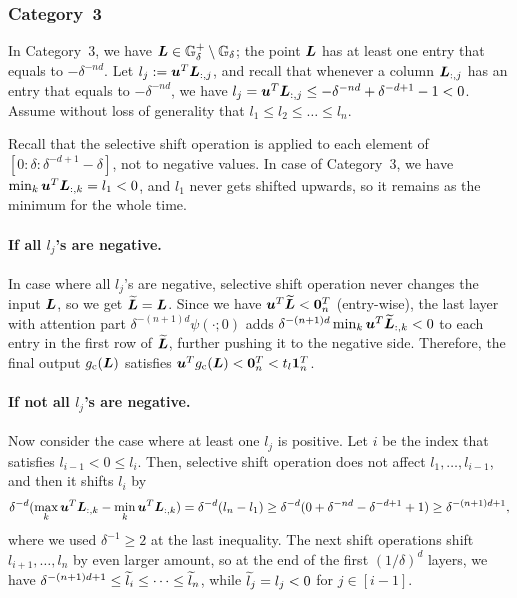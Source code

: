 \subsubsection{Category~3}
In Category~3, we have ${\bm{L}} \in {\mathbb{G}}^+_{\delta} \setminus {\mathbb{G}}_{\delta}$; the point ${\bm{L}}$ has at least one entry that equals to $-\delta^{-nd}$.
Let $l_j := {\bm{u}}^T {\bm{L}}_{:,j}$, and recall that whenever a column ${\bm{L}}_{:,j}$ has an entry that equals to $-\delta^{-nd}$, we have $l_j = {\bm{u}}^T {\bm{L}}_{:,j} \leq -\delta^{-nd} + \delta^{-d+1} - 1 < 0$.
Assume without loss of generality that $l_1 \leq l_2 \leq \dots \leq l_n$.

Recall that the selective shift operation is applied to each element of $[0:\delta:\delta^{-d+1}-\delta]$, not to negative values.
In case of Category~3, we have $\min_k {\bm{u}}^T {\bm{L}}_{:,k} = l_1 < 0$, and $l_1$ never gets shifted upwards, so it remains as the minimum for the whole time.

\paragraph{If all $l_j$'s are negative.}
In case where all $l_j$'s are negative, selective shift operation never changes the input ${\bm{L}}$, so we get $\widetilde{{\bm{L}}} = {\bm{L}}$. Since we have ${\bm{u}}^T \widetilde{{\bm{L}}} < {\bm{0}}_n^T$ (entry-wise), the last layer with attention part $\delta^{-(n+1)d} \psi(\cdot;0)$ adds $\delta^{-(n+1)d} \min_k {\bm{u}}^T \widetilde{{\bm{L}}}_{:,k} < 0$ to each entry in the first row of $\widetilde{{\bm{L}}}$, further pushing it to the negative side. Therefore, the final output $g_{\rm c}({\bm{L}})$ satisfies ${\bm{u}}^T g_{\rm c}({\bm{L}}) < {\bm{0}}_n^T < t_l{\bm{1}}_n^T$.

\paragraph{If not all $l_j$'s are negative.}
Now consider the case where at least one $l_j$ is positive. Let $i$ be the index that satisfies $l_{i-1} < 0 \leq l_{i}$. Then, selective shift operation does not affect $l_1, \dots, l_{i-1}$, and then it shifts $l_{i}$ by
\begin{equation*}
    \delta^{-d}(\max_k {\bm{u}}^T {\bm{L}}_{:,k} - \min_k {\bm{u}}^T {\bm{L}}_{:,k})
    = \delta^{-d} (l_n - l_1)
    \geq \delta^{-d} (0 + \delta^{-nd} - \delta^{-d+1} + 1)
    \geq \delta^{-(n+1)d+1},
\end{equation*}
where we used $\delta^{-1} \geq 2$ at the last inequality.
The next shift operations shift $l_{i+1}, \dots, l_n$ by even larger amount, so at the end of the first $(1/\delta)^d$ layers, we have 
$\delta^{-(n+1)d+1} \leq \widetilde{l}_{i} \leq \dots \leq \widetilde{l}_n$,
while $\widetilde{l}_j = l_j < 0$ for $j \in [i-1]$.

